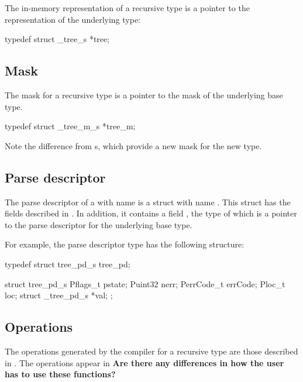 The in-memory representation of a recursive type is a pointer to the
representation of the underlying type:

\begin{code}
typedef struct _tree_s    *tree;
\end{code}

\subsection{Mask}
\label{sec:recur-masks}
The mask for a recursive type is a pointer to the mask of the
underlying base type.

\begin{code}
typedef struct _tree_m_s  *tree_m;
\end{code}

Note the difference from \ptypedef{}s, which provide a new mask for the new type.

\subsection{Parse descriptor}
\label{sec:recur-parse-descriptors}
The parse descriptor of a \Precur{} with name  is a \C{}
struct with name .  This struct has the fields
described in . In addition, it
contains a field , the type of which is a pointer to the parse
descriptor for the underlying base type.

For example, the parse descriptor type  has
the following structure:

\begin{code}
typedef struct tree_pd_s tree_pd;

struct tree_pd_s {
  Pflags_t pstate;
  Puint32 nerr;
  PerrCode_t errCode;
  Ploc_t loc;
  struct _tree_pd_s *val;
};
\end{code}

\subsection{Operations}
The operations generated by the \pads{} compiler for a recursive type are
those described in .
The operations appear in 
\textbf{Are there any differences in how the user has to use these
  functions?}


